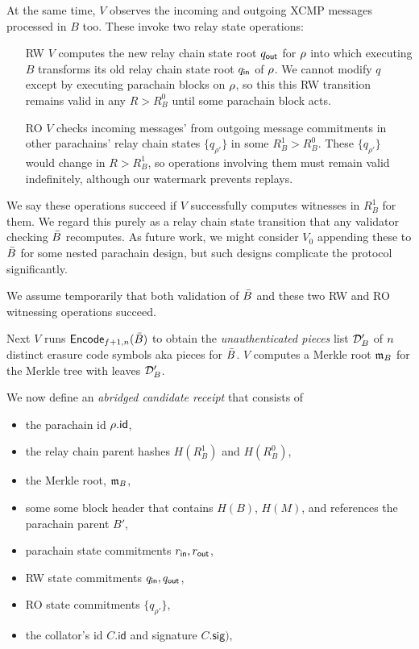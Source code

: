 At the same time, $V$ observes the incoming and outgoing XCMP messages processed in $B$ too.  These invoke two relay state operations:
\begin{itemize}
\item[RW] $V$ computes the new relay chain state root $q_{\mathsf{out}}$ for $\rho$ into which executing $B$ transforms its old relay chain state root $q_{\mathsf{in}}$ of $\rho$.  We cannot modify $q$ except by executing parachain blocks on $\rho$, so this this RW transition remains valid in any $R > R^0_B$ until some parachain block acts.
\item[RO] $V$ checks incoming messages' from outgoing message commitments in other parachains' relay chain states $\{ q_{\rho'} \}$ in some $R^1_B > R^0_B$.  These $\{ q_{\rho'} \}$ would change in $R > R^1_B$, so operations involving them must remain valid indefinitely, although our watermark prevents replays.  
\end{itemize}
We say these operations succeed if $V$ successfully computes witnesses in $R^1_B$ for them.  We regard this purely as a relay chain state transition that any validator checking $\bar{B}$ recomputes.  As future work, we might consider $V_0$ appending these to $\bar{B}$ for some nested parachain design, but such designs complicate the protocol significantly.  

We assume temporarily that both validation of $\bar{B}$ and these two RW and RO witnessing operations succeed.

Next $V$ runs $\mathsf{Encode}_{f+1,n}(\bar{B})$ to obtain the {\em unauthenticated pieces} list $\mathcal{D}'_B$ of $n$ distinct erasure code symbols aka pieces for $\bar{B}$.  $V$ computes a Merkle root $\mathfrak{m}_B$ for the Merkle tree with leaves $\mathcal{D}'_B$.  

We now define an {\em abridged candidate receipt} that consists of 
\begin{itemize}
\item the parachain id $\rho.\mathsf{id}$,
\item the relay chain parent hashes $H(R^1_B)$ and $H(R^0_B)$, 
\item the Merkle root, $\mathfrak{m}_B$,
\item some some block header that contains $H(B)$, $H(M)$, and references the parachain parent $B'$,
\item parachain state commitments $r_{\mathsf{in}},r_{\mathsf{out}}$, 
\item RW state commitments $q_{\mathsf{in}},q_{\mathsf{out}}$,
\item RO state commitments $\{ q_{\rho'} \}$,
\item the collator's id $C.\mathsf{id}$ and signature $C.\mathsf{sig})$,
\end{itemize}

